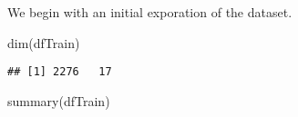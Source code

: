 \documentclass[
]{article}
\newenvironment{Shaded}{\begin{snugshade}}{\end{snugshade}}
\newcommand{\FunctionTok}[1]{\textcolor[rgb]{0.00,0.00,0.00}{#1}}
\newcommand{\NormalTok}[1]{#1}
\begin{document}
We begin with an initial exporation of the dataset.

\begin{Shaded}
\begin{Highlighting}[]
\FunctionTok{dim}\NormalTok{(dfTrain)}
\end{Highlighting}
\end{Shaded}

\begin{verbatim}
## [1] 2276   17
\end{verbatim}

\begin{Shaded}
\begin{Highlighting}[]
\FunctionTok{summary}\NormalTok{(dfTrain)}
\end{Highlighting}
\end{Shaded}
\end{document}

